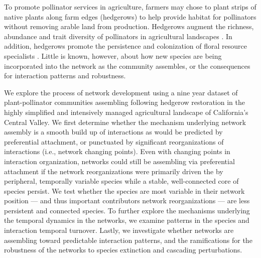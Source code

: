 \documentclass[12pt]{article}
\begin{document}
To promote pollinator services in agriculture, farmers may chose to
plant strips of native plants along farm edges (hedgerows) to help
provide habitat for pollinators without removing arable land from
production. Hedgerows augment the richness, abundance and trait
diversity of pollinators in agricultural landscapes
\citep{morandin-2013-829, mgonigle-2015-x, kremen-2015-602,
  ponisio2015farm}. In addition, hedgerows promote the persistence and
colonization of floral resource specialists
\citep{mgonigle-2015-x}. Little is known, however, about how new
species are being incorporated into the network as the community
assembles, or the consequences for interaction patterns and
robustness.

We explore the process of network development using a nine year
dataset of plant-pollinator communities assembling following hedgerow
restoration in the highly simplified and intensively managed
agricultural landscape of California's Central Valley.  We first
determine whether the mechanism underlying network assembly is a
smooth build up of interactions as would be predicted by preferential
attachment, or punctuated by significant reorganizations of
interactions (i.e., network changing points). Even with changing
points in interaction organization, networks could still be assembling
via preferential attachment if the network reorganizations were
primarily driven the by peripheral, temporally variable species while
a stable, well-connected core of species persist. We test whether the
species are most variable in their network position --- and thus
important contributors network reorganizations --- are less persistent
and connected species. To further explore the mechanisms underlying
the temporal dynamics in the networks, we examine patterns in the
species and interaction temporal turnover. Lastly, we investigate
whether networks are assembling toward predictable interaction
patterns, and the ramifications for the robustness of the networks to
species extinction and cascading perturbations.

\end{document}
